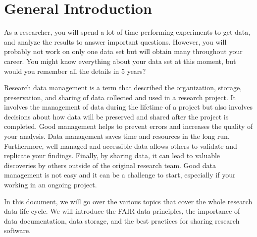 \chapter{General Introduction}
As a researcher, you will spend a lot of time performing experiments to get data, and analyze the results to answer important questions. However, you will probably not work on only one data set but will obtain many throughout your career. You might know everything about your data set at this moment, but would you remember all the details in 5 years? \par 

Research data management is a term that described the organization, storage, preservation, and sharing of data collected and used in a research project. It involves the management of data during the lifetime of a project but also involves decisions about how data will be preserved and shared after the project is completed. 
Good management helps to prevent errors and increases the quality of your analysis. Data management saves time and resources in the long run, Furthermore, well-managed and accessible data allows others to validate and replicate your findings. Finally, by sharing data, it can lead to valuable discoveries by others outside of the original research team.
Good data management is not easy and it can be a challenge to start, especially if your working in an ongoing project.  \par

In this document, we will go over the various topics that cover the whole research data life cycle. We will introduce the FAIR data principles, the importance of data documentation, data storage, and the best practices for sharing research software. 
